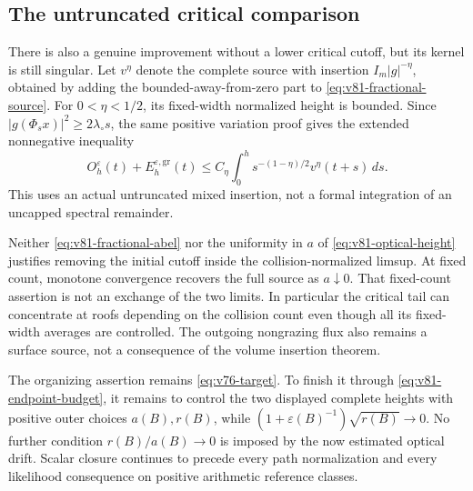 \subsection{The untruncated critical comparison}
There is also a genuine improvement without a lower critical cutoff,
but its kernel is still singular. Let $v^\eta$ denote the complete
source with insertion $I_m|g|^{-\eta}$, obtained by adding the
bounded-away-from-zero part to \eqref{eq:v81-fractional-source}.
For $0<\eta<1/2$, its fixed-width normalized height is bounded.
Since $|g(\Phi_sx)|^2\ge2\lambda_\circ s$, the same positive
variation proof gives the extended nonnegative inequality
\begin{equation}\label{eq:v81-fractional-abel}
 O_h^\varepsilon(t)+E_h^{\varepsilon,\mathrm{gr}}(t)
       \le C_\eta\int_0^h s^{-(1-\eta)/2}v^\eta(t+s)\,ds.
\end{equation}
This uses an actual untruncated mixed insertion, not a formal
integration of an uncapped spectral remainder.

Neither \eqref{eq:v81-fractional-abel} nor the uniformity in $a$
of \eqref{eq:v81-optical-height} justifies removing the initial
cutoff inside the collision-normalized limsup. At fixed count,
monotone convergence recovers the full source as $a\downarrow0$.
That fixed-count assertion is not an exchange of the two limits.
In particular the critical tail can concentrate at roofs depending
on the collision count even though all its fixed-width averages
are controlled. The outgoing nongrazing flux also remains a
surface source, not a consequence of the volume insertion theorem.

The organizing assertion remains \eqref{eq:v76-target}. To finish
it through \eqref{eq:v81-endpoint-budget}, it remains to control
the two displayed complete heights with positive outer choices
$a(B),r(B)$, while
$(1+\varepsilon(B)^{-1})\sqrt{r(B)}\to0$. No further condition
$r(B)/a(B)\to0$ is imposed by the now estimated optical drift.
Scalar closure continues to precede every path normalization and
every likelihood consequence on positive arithmetic reference classes.
